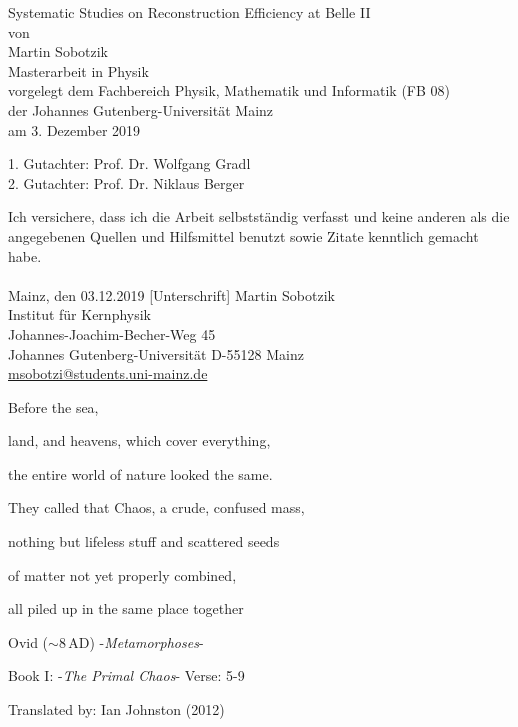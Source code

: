 \documentclass[a4paper,11pt,twosided,final,german,openbib,pdftex,listof=totoc,bibliography=totoc]{scrbook}
\newcommand\blankpage{%
	\null
	\thispagestyle{empty}%
	\addtocounter{page}{-1}%
	\newpage}
\begin{document}

\begin{titlepage}
  \vspace*{6mm}
  \begin{center}
     {\afont Systematic Studies on Reconstruction Efficiency at Belle II}
     \\[3.5cm]
     {\large von}
     \\[3.5cm]
     {\dfont Martin Sobotzik}
     \\[2cm]
     {\large Masterarbeit in Physik \/\\
        vorgelegt dem Fachbereich Physik, Mathematik und Informatik (FB 08) \/\\
        der Johannes Gutenberg-Universit\"at Mainz \/\\
        am 3. Dezember 2019}
   \end{center}
   \vfill
   1. Gutachter: Prof. Dr. Wolfgang Gradl\\	
   2. Gutachter: Prof. Dr. Niklaus Berger\\
   \vfill

\afterpage{\blankpage}


\end{titlepage}
\newpage


 

\thispagestyle{empty}
Ich versichere, dass ich die Arbeit selbstst\"andig verfasst und keine 
anderen als die angegebenen Quellen und Hilfsmittel benutzt sowie 
Zitate kenntlich gemacht habe.
\\
\\[3.5cm] 
Mainz, den 03.12.2019 [Unterschrift]
\vfill
\noindent 
Martin Sobotzik\\
Institut f\"ur Kernphysik\\
Johannes-Joachim-Becher-Weg 45\\
Johannes Gutenberg-Universit\"at
D-55128 Mainz\\
{\href{msobotzi@students.uni-mainz.de}{msobotzi@students.uni-mainz.de}}




\afterpage{\blankpage}

\newpage



\epigraph{Before the sea,                     
	              
	land, and heavens, which cover everything,
	
	the entire world of nature looked the same.
	
	They called that Chaos, a crude, confused mass,                              
	
	nothing but lifeless stuff and scattered seeds
	
	of matter not yet properly combined,
	
	all piled up in the same place together}{Ovid ($\sim 8\,\textrm{AD}$) -\textit{Metamorphoses}-
	
Book I: -\textit{The Primal Chaos}- Verse: 5-9

Translated by: Ian Johnston (2012)
}
\end{document}

